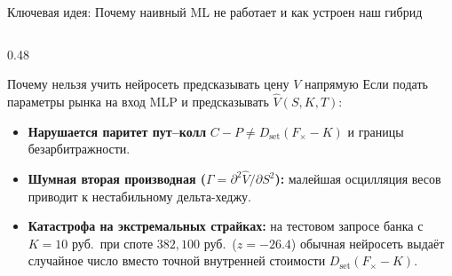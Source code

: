 \documentclass[aspectratio=169, 9pt]{beamer}
\begin{document}
\begin{frame}{Ключевая идея: Почему наивный ML не работает и как устроен наш гибрид}
  \begin{columns}[T]
    \begin{column}{0.48\textwidth}
      \begin{alertblock}{Почему нельзя учить нейросеть предсказывать цену $V$ напрямую}
        Если подать параметры рынка на вход MLP и предсказывать $\hat{V}(S, K, T)$:
        \begin{itemize}
          \item \textbf{Нарушается паритет пут--колл} $C - P \neq D_{\text{set}}(F_\times - K)$ и границы безарбитражности.
          \item \textbf{Шумная вторая производная ($\Gamma = \partial^2 \hat{V}/\partial S^2$):} малейшая осцилляция весов приводит к нестабильному дельта-хеджу.
          \item \textbf{Катастрофа на экстремальных страйках:} на тестовом запросе банка с $K = 10$ руб.\ при споте $382,100$ руб.\ ($z = -26.4$) обычная нейросеть выдаёт случайное число вместо точной внутренней стоимости $D_{\text{set}}(F_\times - K)$.
        \end{itemize}
      \end{alertblock}
    \end{column}


\end{columns}
\end{frame}
\end{document}

